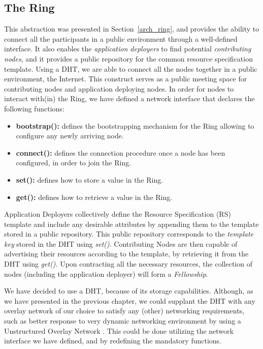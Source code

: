 \documentclass[12pt, titlepage]{uo_temp}
\begin{document}
     \subsection{The Ring}
     This abstraction was presented in Section~\ref{arch_ring}, and provides the ability
     to connect all the participants in a public environment through a well-defined
     interface. It also enables the \emph{application deployers} to find potential
     \emph{contributing nodes}, and it provides a public repository for the common resource
     specification template.
     Using a DHT, we are able to connect all the nodes together in a public
     environment, the Internet. This construct serves as a public meeting space for
     contributing nodes and application deploying nodes. 
     In order for nodes to interact with(in) the Ring, we have defined a network interface
     that declares the following functions: 
     \begin{itemize}
     \item \textbf{bootstrap():} defines the bootstrapping mechanism for the Ring allowing
       to configure any newly arriving node.
     \item \textbf{connect():} defines the connection procedure once a node has been
       configured, in order to join the Ring.
     \item \textbf{set():} defines how to store a value in the Ring. 
     \item \textbf{get():} defines how to retrieve a value in the Ring.
     \end{itemize}     
     Application Deployers collectively define the Resource Specification (RS) template
     and include any desirable attributes by appending them to the template stored in a
     public repository. This public repository corresponds to the \emph{template key}
     stored in the DHT using \emph{set()}.
     Contributing Nodes are then capable of advertising their resources according to the
     template, by retrieving it from the DHT using \emph{get()}. Upon contracting all the necessary
     resources, the collection of nodes (including the application deployer) will form a
     \emph{Fellowship}.

     We have decided to use a DHT, because of its storage capabilities. Although, as we
     have presented in the previous chapter, we could supplant the DHT with any overlay
     network of our choice to satisfy any (other) networking requirements, such as better
     response to very dynamic networking environment by using a Unstructured Overlay
     Network \cite{lua2005survey}. This could be done utilizing the network interface we
     have defined, and by redefining the mandatory functions.  
     
\end{document}
